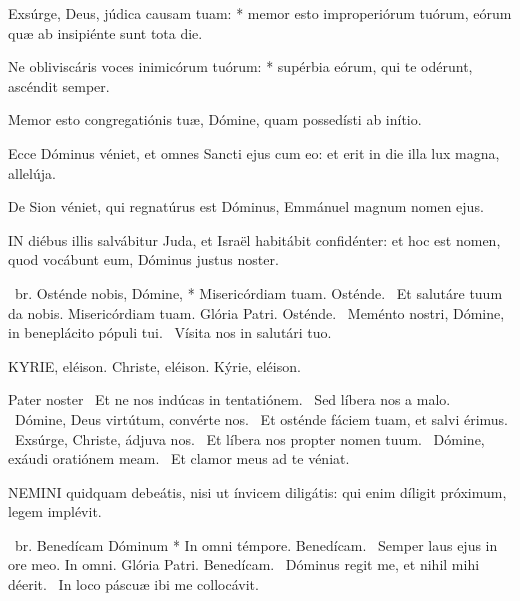 Exsúrge, Deus, júdica causam tuam: * memor esto improperiórum tuórum, eórum quæ ab insipiénte sunt tota die.

Ne obliviscáris voces inimicórum tuórum: * supérbia eórum, qui te odérunt, ascéndit semper.

  Memor esto congregatiónis tuæ, Dómine, quam possedísti ab inítio.


  Ecce Dóminus véniet, et omnes Sancti ejus cum eo: et erit in die illa lux magna, allelúja.

  De Sion véniet, qui regnatúrus est Dóminus, Emmánuel magnum nomen ejus.


\lettrine[lines=2]{I}{N} diébus illis salvábitur Juda, et Israël habitábit confidénter: et hoc est nomen, quod vocábunt eum, Dóminus justus noster.

\R\ br. Osténde nobis, Dómine, * Misericórdiam tuam. Osténde. \V\ Et salutáre tuum da nobis. Misericórdiam tuam. Glória Patri. Osténde. \V\ Meménto nostri, Dómine, in beneplácito pópuli tui. \R\ Vísita nos in salutári tuo.


KYRIE, eléison. Christe, eléison. Kýrie, eléison.

Pater noster  \V\ Et ne nos indúcas in tentatiónem. \R\ Sed líbera nos a malo. \V\ Dómine, Deus virtútum, convérte nos. \R\ Et osténde fáciem tuam, et salvi érimus. \V\ Exsúrge, Christe, ádjuva nos. \R\ Et líbera nos propter nomen tuum. \V\ Dómine, exáudi oratiónem meam. \R\ Et clamor meus ad te véniat.




\lettrine[lines=2]{N}{EMINI} quidquam debeátis, nisi ut ínvicem diligátis: qui enim díligit próximum, legem implévit.

\R\ br. Benedícam Dóminum * In omni témpore. Benedícam. \V\ Semper laus ejus in ore meo. In omni. Glória Patri. Benedícam. \V\ Dóminus regit me, et nihil mihi déerit. \R\ In loco páscuæ ibi me collocávit.


